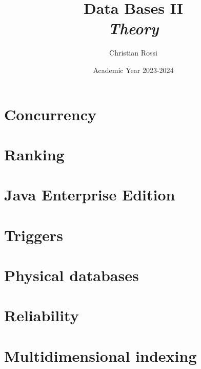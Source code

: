 \documentclass[12pt, a4paper]{report}
\title{Data Bases II \\ \textit{Theory}}
\author{Christian Rossi}
\date{Academic Year 2023-2024}
\begin{document}
    \maketitle

    

    \cleardoublepage

    \tableofcontents

    \cleardoublepage

    \chapter{Concurrency}
    
    
    
    
    
    
    
    
    

    \chapter{Ranking}
    
    
    
    
    
    

    \chapter{Java Enterprise Edition}
    
    
    
    
    
    
    

    \chapter{Triggers}
    
    
    
    

    \chapter{Physical databases}
        
      
      
    
    \chapter{Reliability}
    
    

    \chapter{Multidimensional indexing}
    
    
    
\end{document}
